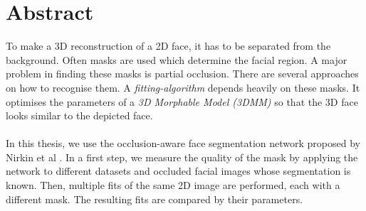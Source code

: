 \chapter{Abstract}

To make a 3D reconstruction of a 2D face, it has to be separated from the background. Often masks are used which determine the facial region. A major problem in finding these masks is partial occlusion. There are several approaches on how to recognise them. A \textit{fitting-algorithm} depends heavily on these masks. It optimises the parameters of a \textit{3D Morphable Model (3DMM)} so that the 3D face looks similar to the depicted face.\\
\\
In this thesis, we use the occlusion-aware face segmentation network proposed by Nirkin et al \cite{nirkin2018_faceswap}. In a first step, we measure the quality of the mask by applying the network to different datasets and occluded facial images whose segmentation is known. Then, multiple fits of the same 2D image are performed, each with a different mask. The resulting fits are compared by their parameters.